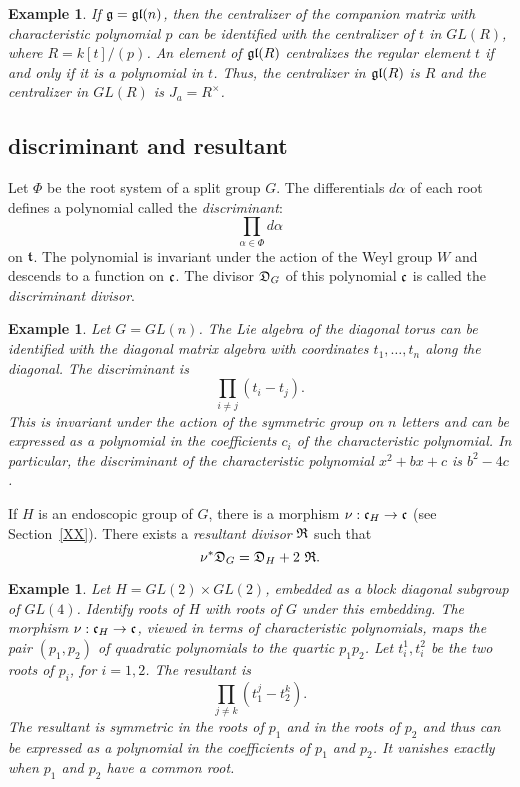 \documentclass[brochure,english,12pt]{bourbaki}
\newtheorem{example}[equation]{Example}
\def\gl{\frak{gl}}
\def\g{\frak{g}}
\def\t{\frak{t}}
\def\cc{\frak{c}}
\def\DIV{{\frak{D}}}
\def\RDIV{{\frak{R}}}
\begin{document}
\begin{example}
  If $\g=\gl(n)$, then the centralizer of the companion matrix with
  characteristic polynomial $p$ can be identified with the centralizer
  of $t$ in $GL(R)$, where $R=k[t]/(p)$.  An
  element of $\gl(R)$ centralizes the regular element $t$ if and only if it is a polynomial
  in $t$.  Thus, the centralizer in $\gl(R)$ is $R$ and the centralizer in $GL(R)$
 is $J_a = R^\times$.
\end{example}


\subsection{discriminant and resultant}

Let $\Phi$ be the root system of a split group $G$.  The differentials $d\alpha$ of each
root defines a  polynomial called the {\it discriminant}:
\begin{equation}\label{eqn:disc}
\prod_{\alpha\in\Phi} d\alpha
\end{equation}
on $\t$.  The polynomial is invariant under the action of the Weyl group 
$W$ and descends to a function on $\cc$.
The divisor $\DIV_G$ of this polynomial $\cc$ is called the {\it discriminant divisor}.

\begin{example} Let $G=GL(n)$.  The Lie algebra of the diagonal torus
  can be identified with the diagonal matrix algebra with coordinates
  $t_1,\ldots,t_n$ along the diagonal.  The discriminant is
\[\prod_{i\ne j} (t_i - t_j).\]
This  is invariant under the action of the symmetric group on $n$ letters 
and can be expressed as a polynomial in the coefficients $c_i$ of the characteristic polynomial.
In particular, the discriminant of the characteristic polynomial $x^2 + b x + c$ is $b^2 - 4 c$.
\end{example}

If $H$ is an endoscopic group of $G$, there is a morphism $\nu:\cc_H\to \cc$ (see Section~\ref{XX}).  There exists
a {\it resultant divisor} $\RDIV$ such that
\[
\nu^*\DIV_G = \DIV_H + 2\,\, \RDIV.
\]

\begin{example} Let $H=GL(2)\times GL(2)$, embedded as a block
  diagonal subgroup of $GL(4)$.  Identify roots of $H$ with roots of $G$ under this embedding.
 The morphism $\nu:\cc_H\to \cc$,
  viewed in terms of characteristic polynomials, maps the pair
  $(p_1,p_2)$ of quadratic polynomials to the quartic $p_1p_2$.  Let
  $t^1_i,t^2_i$ be the two roots of $p_i$, for $i=1,2$.  The resultant is
\[
\prod_{j\ne k} (t^j_1 - t^k_2).
\]
  The
resultant is symmetric in the roots of $p_1$ and in the roots of $p_2$
and thus can be expressed as a polynomial  in the coefficients
of $p_1$ and $p_2$.  It vanishes exactly when $p_1$ and $p_2$ have a common root.
\end{example}
\end{document}
